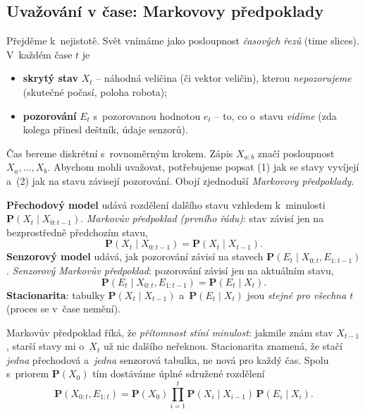 \subsection{Uvažování v čase: Markovovy předpoklady}

Přejděme k~nejistotě. Svět vnímáme jako posloupnost \emph{časových řezů} (time slices). V~každém čase $t$ je
\begin{itemize}
  \item \textbf{skrytý stav} $X_t$ -- náhodná veličina (či vektor veličin), kterou \emph{nepozorujeme} (skutečné počasí, poloha robota);
  \item \textbf{pozorování} $E_t$ s~pozorovanou hodnotou $e_t$ -- to, co o~stavu \emph{vidíme} (zda kolega přinesl deštník, údaje senzorů).
\end{itemize}
Čas bereme diskrétní s~rovnoměrným krokem. Zápis $X_{a:b}$ značí posloupnost $X_a,\dots,X_b$. Abychom mohli uvažovat, potřebujeme popsat (1) jak se stavy vyvíjejí a~(2) jak na stavu závisejí pozorování. Obojí zjednoduší \emph{Markovovy předpoklady}.

\begin{definice}
\textbf{Přechodový model} udává rozdělení dalšího stavu vzhledem k~minulosti $\mathbf{P}(X_t\mid X_{0:t-1})$. \emph{Markovův předpoklad (prvního řádu)}: stav závisí jen na bezprostředně předchozím stavu,
\[
  \mathbf{P}(X_t \mid X_{0:t-1}) = \mathbf{P}(X_t \mid X_{t-1}).
\]
\textbf{Senzorový model} udává, jak pozorování závisí na stavech $\mathbf{P}(E_t\mid X_{0:t},E_{1:t-1})$. \emph{Senzorový Markovův předpoklad}: pozorování závisí jen na aktuálním stavu,
\[
  \mathbf{P}(E_t \mid X_{0:t},E_{1:t-1}) = \mathbf{P}(E_t \mid X_t).
\]
\textbf{Stacionarita}: tabulky $\mathbf{P}(X_t\mid X_{t-1})$ a~$\mathbf{P}(E_t\mid X_t)$ jsou \emph{stejné pro všechna $t$} (proces se v~čase nemění).
\end{definice}

\begin{intuice}
Markovův předpoklad říká, že \emph{přítomnost stíní minulost}: jakmile znám stav $X_{t-1}$, starší stavy mi o~$X_t$ už nic dalšího neřeknou. Stacionarita znamená, že stačí \emph{jedna} přechodová a~\emph{jedna} senzorová tabulka, ne nová pro každý čas. Spolu s~priorem $\mathbf{P}(X_0)$ tím dostáváme úplné sdružené rozdělení
\[
  \mathbf{P}(X_{0:t},E_{1:t}) = \mathbf{P}(X_0)\prod_{i=1}^{t} \mathbf{P}(X_i\mid X_{i-1})\,\mathbf{P}(E_i\mid X_i).
\]
\end{intuice}

